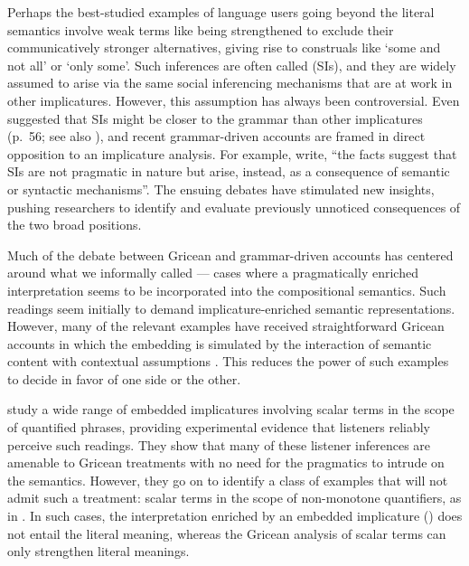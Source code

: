 \documentclass[leqno,12pt]{article}
\begin{document}
Perhaps the best-studied examples of language users going beyond the
literal semantics involve weak terms like  being
strengthened to exclude their communicatively stronger alternatives,
giving rise to construals like `some and not all' or `only some'.
Such inferences are often called  (SIs), and they are widely assumed to arise via the
same social inferencing mechanisms that are at work in other
implicatures.  However, this assumption has always been
controversial. Even \citeauthor{Grice75} suggested that SIs might be
closer to the grammar than other implicatures (p.~56; see also
\citealt{Levinson00,SperberWilson04,Bach06}), and recent
grammar-driven accounts are framed in direct opposition to an
implicature analysis.  For example,
 write, ``the facts suggest that
SIs are not pragmatic in nature but arise, instead, as a consequence
of semantic or syntactic mechanisms''. The ensuing debates have
stimulated new insights, pushing researchers to identify and evaluate
previously unnoticed consequences of the two broad positions.

Much of the debate between Gricean and grammar-driven accounts has
centered around what we informally called 
--- cases where a pragmatically enriched interpretation seems to be
incorporated into the compositional semantics. Such readings seem
initially to demand implicature-enriched semantic representations.
However, many of the relevant examples have received straightforward
Gricean accounts in which the embedding is simulated by the
interaction of semantic content with contextual assumptions
\citep{Russell06,Geurts09}. This reduces the power of such examples to
decide in favor of one side or the other.

\citet{Chemla:Spector:2011} study a wide range of embedded
implicatures involving scalar terms in the scope of quantified
phrases, providing experimental evidence that listeners reliably
perceive such readings. They show that many of these listener
inferences are amenable to Gricean treatments with no need for the
pragmatics to intrude on the semantics. However, they go on to
identify a class of examples that will not admit such a treatment:
scalar terms in the scope of non-monotone quantifiers, as in
. In such cases, the
interpretation enriched by an embedded implicature ()
does not entail the literal meaning, whereas the Gricean analysis of
scalar terms can only strengthen literal meanings.
\end{document}
